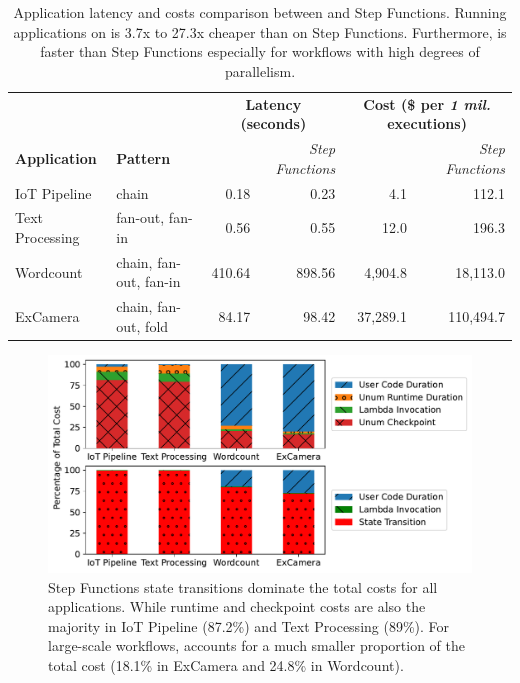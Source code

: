 \begin{table}[t]
  \centering
  \begin{tabular}{ll|rr|rr}
    \hline
    &                        & \multicolumn{2}{c}{\textbf{Latency (seconds)}}            & \multicolumn{2}{c}{\textbf{Cost (\$ per \emph{1 mil.} executions)}}       \\
    \textbf{Application} & \textbf{Pattern}       & \textit{\name{}} & \textit{Step Functions}   & \textit{\name{}} & \textit{Step Functions}            \\ \hline
    IoT Pipeline         & chain                  & 0.18       & 0.23       & 4.1       & 112.1   \\
    Text Processing      & fan-out, fan-in        & 0.56       & 0.55       & 12.0      & 196.3   \\
    Wordcount            & chain, fan-out, fan-in & 410.64     & 898.56     & 4,904.8   & 18,113.0 \\
    ExCamera             & chain, fan-out, fold   & 84.17      & 98.42      & 37,289.1   & 110,494.7      \\ \hline
  \end{tabular}
  \caption{Application latency and costs comparison between \name{} and Step
    Functions. Running applications on \name{} is 3.7x to 27.3x cheaper than
    on Step Functions. Furthermore, \name{} is faster than Step Functions
    especially for workflows with high degrees of parallelism.}
  \label{table:macro}
\end{table}

\begin{figure}[t!]
    \centering
    \includegraphics[width=\columnwidth]{figures/AppCostBreakdown.pdf}
    \caption{Step Functions state transitions dominate the total costs for all
    applications. While \name{} runtime and checkpoint costs are also the
    majority in IoT Pipeline (87.2\%) and Text Processing (89\%). For
    large-scale workflows, \name{} accounts for a much smaller proportion of
    the total cost (18.1\% in ExCamera and 24.8\% in Wordcount).}
    \label{fig:cost-breakdown}
\end{figure}

